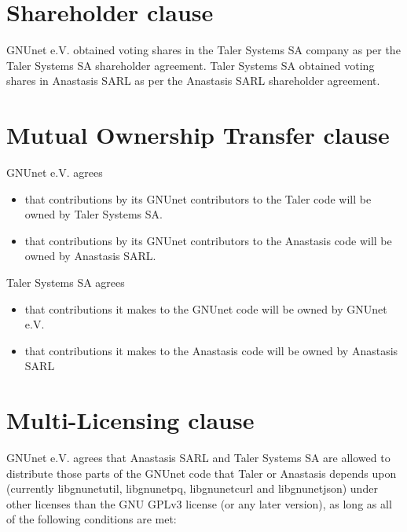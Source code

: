 \documentclass[12pt, a4paper, bibliography=totocnumbered]{article}
\begin{document}
\section*{Shareholder clause}

GNUnet e.V. obtained voting shares in the Taler Systems SA company as
per the Taler Systems SA shareholder agreement.  Taler Systems SA
obtained voting shares in Anastasis SARL as per the Anastasis SARL shareholder agreement.

\section*{Mutual Ownership Transfer clause}

GNUnet e.V. agrees
\begin{itemize}
\item that contributions by its GNUnet contributors to the Taler code will be owned by Taler Systems SA.
\item that contributions by its GNUnet contributors to the Anastasis code will be owned by Anastasis SARL.
\end{itemize}
Taler Systems SA agrees
\begin{itemize}
\item that contributions it makes to the GNUnet code will be owned by GNUnet e.V.
\item that contributions it makes to the Anastasis code will be owned by Anastasis SARL
\end{itemize}

\section*{Multi-Licensing clause}

GNUnet e.V. agrees that Anastasis SARL and Taler Systems SA are
allowed to distribute those parts of the GNUnet code that Taler or
Anastasis depends upon (currently libgnunetutil, libgnunetpq,
libgnunetcurl and libgnunetjson) under other licenses than the GNU
GPLv3 license (or any later version), as long as all of the following
conditions are met:
\end{document}
